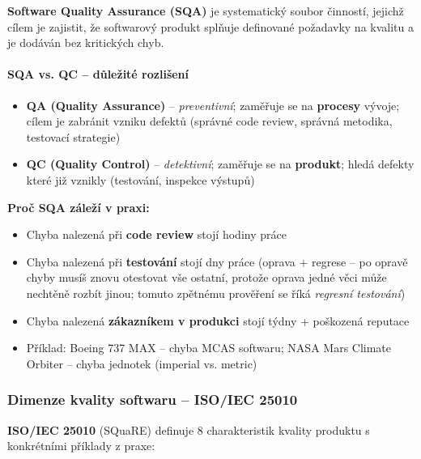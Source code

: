 \textbf{Software Quality Assurance (SQA)} je systematický soubor činností, jejichž cílem je zajistit, že softwarový produkt splňuje definované požadavky na kvalitu a je dodáván bez kritických chyb.

\paragraph{SQA vs. QC -- důležité rozlišení}
\begin{itemize}
  \item \textbf{QA (Quality Assurance)} -- \textit{preventivní}; zaměřuje se na \textbf{procesy} vývoje;
    cílem je zabránit vzniku defektů (správné code review, správná metodika, testovací strategie)
  \item \textbf{QC (Quality Control)} -- \textit{detektivní}; zaměřuje se na \textbf{produkt};
    hledá defekty které již vznikly (testování, inspekce výstupů)
\end{itemize}

\textbf{Proč SQA záleží v praxi:}
\begin{itemize}
  \item Chyba nalezená při \textbf{code review} stojí hodiny práce
  \item Chyba nalezená při \textbf{testování} stojí dny práce (oprava + regrese -- po opravě
    chyby musíš znovu otestovat vše ostatní, protože oprava jedné věci může nechtěně rozbít
    jinou; tomuto zpětnému prověření se říká \textit{regresní testování})
  \item Chyba nalezená \textbf{zákazníkem v produkci} stojí týdny + poškozená reputace
  \item Příklad: Boeing 737 MAX -- chyba MCAS softwaru; NASA Mars Climate Orbiter -- chyba jednotek (imperial vs. metric)
\end{itemize}

\subsubsection{Dimenze kvality softwaru -- ISO/IEC 25010}

\textbf{ISO/IEC 25010} (SQuaRE) definuje 8 charakteristik kvality produktu s konkrétními příklady z praxe:

